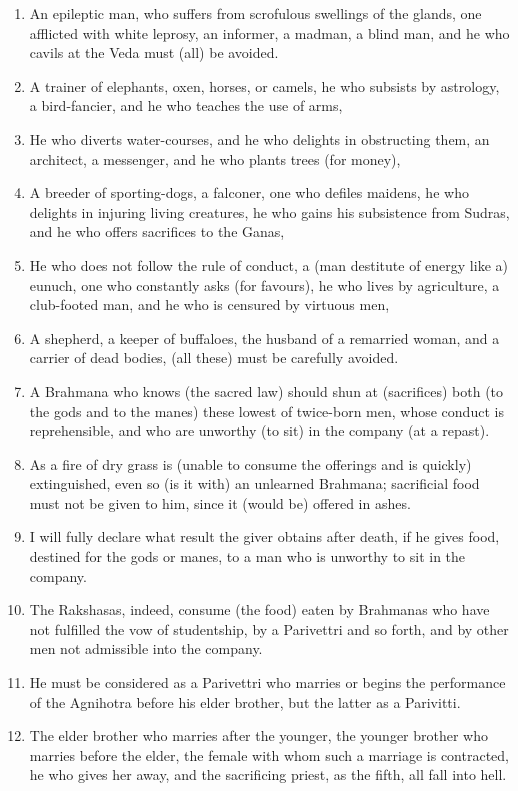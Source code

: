 \begin{enumerate}
\item An epileptic man, who suffers from scrofulous swellings of the glands, one afflicted with white leprosy, an informer, a madman, a blind man, and he who cavils at the Veda must (all) be avoided.
\item A trainer of elephants, oxen, horses, or camels, he who subsists by astrology, a bird-fancier, and he who teaches the use of arms,
\item He who diverts water-courses, and he who delights in obstructing them, an architect, a messenger, and he who plants trees (for money),
\item A breeder of sporting-dogs, a falconer, one who defiles maidens, he who delights in injuring living creatures, he who gains his subsistence from Sudras, and he who offers sacrifices to the Ganas,
\item He who does not follow the rule of conduct, a (man destitute of energy like a) eunuch, one who constantly asks (for favours), he who lives by agriculture, a club-footed man, and he who is censured by virtuous men,
\item A shepherd, a keeper of buffaloes, the husband of a remarried woman, and a carrier of dead bodies, (all these) must be carefully avoided.
\item A Brahmana who knows (the sacred law) should shun at (sacrifices) both (to the gods and to the manes) these lowest of twice-born men, whose conduct is reprehensible, and who are unworthy (to sit) in the company (at a repast).
\item As a fire of dry grass is (unable to consume the offerings and is quickly) extinguished, even so (is it with) an unlearned Brahmana; sacrificial food must not be given to him, since it (would be) offered in ashes.
\item I will fully declare what result the giver obtains after death, if he gives food, destined for the gods or manes, to a man who is unworthy to sit in the company.
\item The Rakshasas, indeed, consume (the food) eaten by Brahmanas who have not fulfilled the vow of studentship, by a Parivettri and so forth, and by other men not admissible into the company.
\item He must be considered as a Parivettri who marries or begins the performance of the Agnihotra before his elder brother, but the latter as a Parivitti.
\item The elder brother who marries after the younger, the younger brother who marries before the elder, the female with whom such a marriage is contracted, he who gives her away, and the sacrificing priest, as the fifth, all fall into hell.

\end{enumerate}
